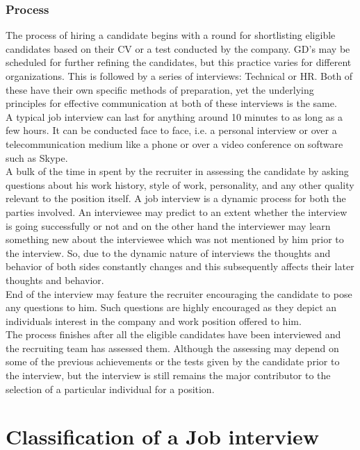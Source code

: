 \documentclass[a4paper,12pt]{report}
\begin{document}
\subsection{Process}                   %
The process  of hiring a candidate begins with a round for shortlisting eligible candidates based on their CV or
a test conducted by the company. GD's may be scheduled for further refining the candidates, but this practice
varies for different organizations. This is followed by a series of interviews: Technical or HR. Both of these have their own specific
methods of preparation, yet the underlying principles for effective communication at both of these interviews is the same.\\
A typical job interview can last for anything around 10 minutes to as long as a few hours. It can be conducted face to face,
 i.e. a personal interview or over a telecommunication medium like a phone or over a video conference on software such as Skype.\\
A bulk of the time in spent by the recruiter in assessing the candidate by asking questions about his work history, style of work, personality,
and any other quality relevant to the position itself. A job interview is a dynamic process\cite{wiki} for both the parties involved.
An interviewee may predict to an extent whether the interview is going successfully or not and on the other hand the interviewer
may learn something new about the interviewee which was not mentioned by him prior to the interview. So,
due to the dynamic nature  of interviews the thoughts and behavior of both sides constantly changes and
this subsequently affects their later thoughts and behavior.\\End of the interview may feature the recruiter encouraging the candidate to pose
any questions to him. Such questions are highly encouraged as they depict an individuals interest in the company and work position offered to him.\\
The process finishes after all the eligible candidates have been interviewed and the recruiting team has assessed them.
Although the assessing may depend on some of the previous achievements or the tests given by the candidate prior to the interview, but the interview
is still remains the major contributor to the selection of a particular individual for a position.


\chapter{Classification of a Job interview}           %
\end{document}
